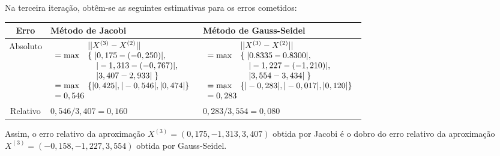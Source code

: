\documentclass[12pt,a4paper]{article}
\begin{document}
\begin{ExerciseList}
\begin{center}
\begin{tabular}{cc}
\end{tabular}
\end{center}
\medskip
Na terceira iteração, obtêm-se as seguintes estimativas para os erros cometidos:
\medskip
\begin{center}
\begin{tabular}{|c|p{7.1cm}|p{7.1cm}|}
\hline
\textbf{Erro}
&
\textbf{Método de Jacobi}
&
\textbf{Método de Gauss-Seidel}\\\hline
Absoluto
&
$\begin{array}{lll}
       & ||X^{(3)} - X^{(2)}|| \\
= \max & \left\{\right. |0,175-(-0,250)|, \\
       & \quad |-1,313-(-0,767)|, \\
       & \quad |3,407 - 2,933| \left.\right\} \\
= \max & \left\{ |0,425|, |-0,546|, |0,474| \right\} \\
= 0,546\hspace{-1cm} & 
\end{array}$
&
$\begin{array}{lll}
       & ||X^{(3)} - X^{(2)}|| \\
= \max & \left\{\right. |0.8335-0.8300|, \\
       & \quad |-1,227-(-1,210)|, \\
       & \quad |3,554-3,434| \left.\right\} \\
= \max & \left\{ |-0,283|, |-0,017|, |0,120| \right\} \\
= 0,283\hspace{-1cm} & 
\end{array}$
\\\hline
Relativo
&
$0,546/3,407 = 0,160$
&
$0,283/3,554 = 0,080$
\\\hline
\end{tabular}
\end{center}

Assim, o erro relativo da aproximação $X^{(3)} = (0,175, -1,313, 3,407)$ obtida por Jacobi é o dobro do erro relativo da aproximação $X^{(3)} = (-0,158, -1,227, 3,554)$ obtida por Gauss-Seidel.


\end{ExerciseList}
\end{document}
